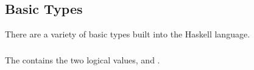 \subsection{Basic Types}\label{subsec:Basic_Types}
There are a variety of basic types built into the Haskell language.

\subsubsection{\texorpdfstring{}{\texttt{Bool}}}\label{subsubsec:Bool_Type}
The   contains the two logical values,  and .

\subsubsection{\texorpdfstring{}{\texttt{Char}}}\label{subsubsec:Char_Type}

\subsubsection{\texorpdfstring{}{\texttt{String}}}\label{subsubsec:String_Type}

\subsubsection{\texorpdfstring{}{\texttt{Int}}}\label{subsubsec:Int_Type}

\subsubsection{\texorpdfstring{}{\texttt{Integer}}}\label{subsubsec:Integer_Type}

\subsubsection{\texorpdfstring{}{\texttt{Float}}}\label{subsubsec:Float_Type}

